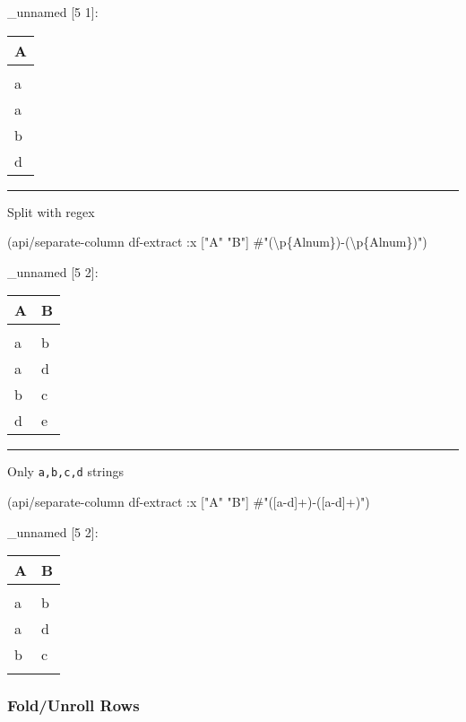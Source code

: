 \documentclass[]{article}
\newenvironment{Shaded}{\begin{snugshade}}{\end{snugshade}}
\newcommand{\AttributeTok}[1]{\textcolor[rgb]{0.77,0.63,0.00}{#1}}
\newcommand{\NormalTok}[1]{#1}
\newcommand{\SpecialStringTok}[1]{\textcolor[rgb]{0.31,0.60,0.02}{#1}}
\newcommand{\StringTok}[1]{\textcolor[rgb]{0.31,0.60,0.02}{#1}}
\begin{document}
\_unnamed {[}5 1{]}:

\begin{longtable}[]{@{}l@{}}
\toprule
A\tabularnewline
\midrule
\endhead
\tabularnewline
a\tabularnewline
a\tabularnewline
b\tabularnewline
d\tabularnewline
\bottomrule
\end{longtable}

\begin{center}\rule{0.5\linewidth}{0.5pt}\end{center}

Split with regex

\begin{Shaded}
\begin{Highlighting}[]
\NormalTok{(api/separate-column df-extract }\AttributeTok{:x}\NormalTok{ [}\StringTok{"A"} \StringTok{"B"}\NormalTok{] }\SpecialStringTok{#"(\textbackslash{}p\{Alnum\})-(\textbackslash{}p\{Alnum\})"}\NormalTok{)}
\end{Highlighting}
\end{Shaded}

\_unnamed {[}5 2{]}:

\begin{longtable}[]{@{}ll@{}}
\toprule
A & B\tabularnewline
\midrule
\endhead
&\tabularnewline
a & b\tabularnewline
a & d\tabularnewline
b & c\tabularnewline
d & e\tabularnewline
\bottomrule
\end{longtable}

\begin{center}\rule{0.5\linewidth}{0.5pt}\end{center}

Only \texttt{a,b,c,d} strings

\begin{Shaded}
\begin{Highlighting}[]
\NormalTok{(api/separate-column df-extract }\AttributeTok{:x}\NormalTok{ [}\StringTok{"A"} \StringTok{"B"}\NormalTok{] }\SpecialStringTok{#"([a-d]+)-([a-d]+)"}\NormalTok{)}
\end{Highlighting}
\end{Shaded}

\_unnamed {[}5 2{]}:

\begin{longtable}[]{@{}ll@{}}
\toprule
A & B\tabularnewline
\midrule
\endhead
&\tabularnewline
a & b\tabularnewline
a & d\tabularnewline
b & c\tabularnewline
&\tabularnewline
\bottomrule
\end{longtable}

\hypertarget{foldunroll-rows}{%
\subsubsection{Fold/Unroll Rows}\label{foldunroll-rows}}
\end{document}
